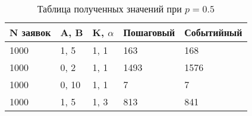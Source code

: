 \FloatBarrier
\begin{table}[h]
	\caption{Таблица полученных значений при $ p = 0.5 $}
	\centering
	\begin{tabular}{ | l | l | l | l | l |}
		\hline
		N заявок & A, B & K, $\alpha$ & Пошаговый & Событийный  \\ 
		\hline
		1000 & 1, 5 & 1, 1 & 163 & 168 \\
		\hline
		1000 & 0, 2 & 1, 1 & 1493 & 1576 \\
		\hline
		1000 & 0, 10 & 1, 1 & 7 & 7 \\
		\hline
		1000 & 1, 5 & 1, 3 & 813 & 841 \\
		\hline
	\end{tabular}
\end{table}
\FloatBarrier